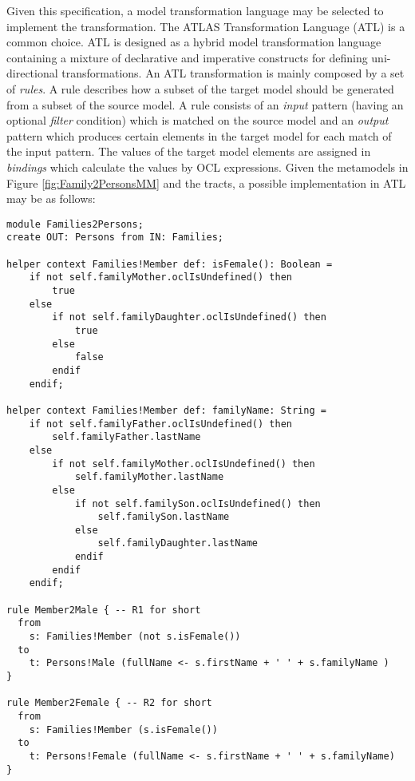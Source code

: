 Given this specification, a model transformation language may be selected to implement the transformation. The ATLAS Transformation Language (ATL) \cite{ATL} is a common choice. ATL is designed as a hybrid model transformation language containing a mixture of declarative and imperative constructs for defining uni-directional transformations. An ATL transformation is mainly composed by a set of \emph{rules}. A rule describes how a subset of the target model should be generated from a subset of the source model. A rule consists of an \textit{input} pattern (having an optional \emph{filter} condition) which is matched on the source model and an \textit{output} pattern which produces certain elements in the target model for each match of the input pattern. The values of the target model elements are assigned in \emph{bindings} which calculate the values by OCL expressions. Given the metamodels in Figure \ref{fig:Family2PersonsMM} and the tracts, a possible implementation in ATL may be as follows:

\begin{lstlisting}[numbers=none]
module Families2Persons;
create OUT: Persons from IN: Families;

helper context Families!Member def: isFemale(): Boolean =
    if not self.familyMother.oclIsUndefined() then
		true
	else
		if not self.familyDaughter.oclIsUndefined() then
			true
		else
			false
		endif
	endif;

helper context Families!Member def: familyName: String =
	if not self.familyFather.oclIsUndefined() then
		self.familyFather.lastName
	else
		if not self.familyMother.oclIsUndefined() then
			self.familyMother.lastName
		else
			if not self.familySon.oclIsUndefined() then
				self.familySon.lastName
			else
				self.familyDaughter.lastName
			endif
		endif
	endif;

rule Member2Male { -- R1 for short
  from
    s: Families!Member (not s.isFemale())
  to
    t: Persons!Male (fullName <- s.firstName + ' ' + s.familyName )
}

rule Member2Female { -- R2 for short
  from
    s: Families!Member (s.isFemale())
  to
    t: Persons!Female (fullName <- s.firstName + ' ' + s.familyName)
}
\end{lstlisting}

